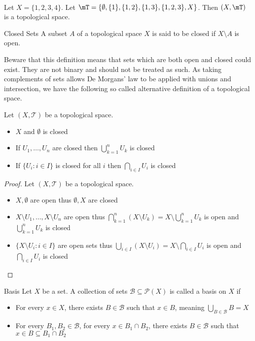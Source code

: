 \documentclass[a4paper]{article}
\begin{document}
\begin{eg}{}{}\\
Let $X=\{1,2,3,4\}$. Let $\mT=\{\emptyset,\{1\},\{1,2\},\{1,3\},\{1,2,3\},X\}$. Then $(X,\mT)$ is a topological space. 
\end{eg}

\begin{defn}{Closed Sets}{} A subset $A$ of a topological space $X$ is said to be closed if $X\setminus A$ is open. 
\end{defn}

Beware that this definition means that sets which are both open and closed could exist. They are not binary and should not be treated as such. As taking complements of sets allows De Morgans' law to be applied with unions and intersection, we have the following so called alternative definition of a topological space. 

\begin{prp}{}{} Let $(X,\mathcal{T})$ be a topological space. 
\begin{itemize}
\item $X$ and $\emptyset$ is closed
\item If $U_1,\dots,U_n$ are closed then $\bigcup_{k=1}^nU_k$ is closed
\item If $\{U_i:i\in I\}$ is closed for all $i$ then $\bigcap_{i\in I}U_i$ is closed
\end{itemize}
\begin{proof}
Let $(X,\mathcal{T})$ be a topological space. 
\begin{itemize}
\item $X,\emptyset$ are open thus $\emptyset,X$ are closed
\item $X\setminus U_1,\dots,X\setminus U_n$ are open thus $\bigcap_{k=1}^n(X\setminus U_k)=X\setminus\bigcup_{k=1}^nU_k$ is open and $\bigcup_{k=1}^nU_k$ is closed
\item $\{X\setminus U_i:i\in I\}$ are open sets thus $\bigcup_{i\in I}(X\setminus U_i)=X\setminus\bigcap_{i\in I}U_i$ is open and $\bigcap_{i\in I}U_i$ is closed
\end{itemize}
\end{proof}
\end{prp}

\begin{defn}{Basis}{} Let $X$ be a set. A collection of sets $\mathcal{B}\subseteq\mathcal{P}(X)$ is called a basis on $X$ if
\begin{itemize}
\item For every $x\in X$, there exists $B\in\mathcal{B}$ such that $x\in B$, meaning $\bigcup_{B\in\mathcal{B}}B=X$
\item For every $B_1,B_2\in\mathcal{B}$, for every $x\in B_1\cap B_2$, there exists $B\in\mathcal{B}$ such that $x\in B\subseteq B_1\cap B_2$
\end{itemize}
\end{defn}
\end{document}
